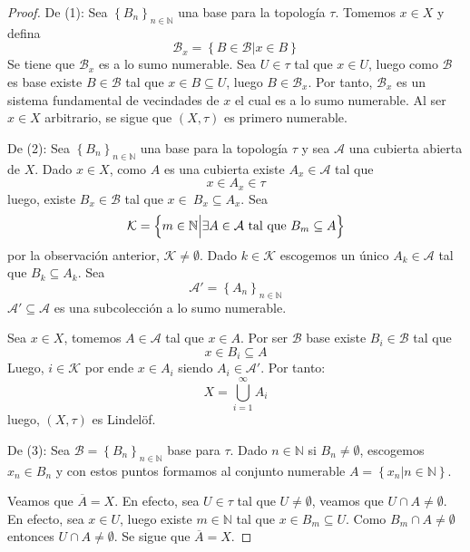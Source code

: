\documentclass[12pt]{report}
\theoremstyle{largebreak}
\newcommand{\Cls}[1]{\ensuremath{\overline{#1}}}
\begin{document}
    \begin{proof}
        De (1): Sea $\left\{ B_n\right\}_{ n\in\mathbb{N}}$ una base para la topología $\tau$. Tomemos $x\in X$ y defina
        \begin{equation*}
            \mathcal{B}_x=\left\{B\in\mathcal{B} \Big|x\in B \right\}
        \end{equation*}
        Se tiene que $\mathcal{B}_x$ es a lo sumo numerable. Sea $U\in\tau$ tal que $x\in U$, luego como $\mathcal{B}$ es base existe $B\in\mathcal{B}$ tal que $x\in B\subseteq U$, luego $B\in\mathcal{B}_x$. Por tanto, $\mathcal{B}_x$ es un sistema fundamental de vecindades de $x$ el cual es a lo sumo numerable. Al ser $x\in X$ arbitrario, se sigue que $(X,\tau)$ es primero numerable.

        De (2): Sea $\left\{ B_n\right\}_{ n\in\mathbb{N}}$ una base para la topología $\tau$ y sea $\mathcal{A}$ una cubierta abierta de $X$. Dado $x\in X$, como $A$ es una cubierta existe $A_x\in\mathcal{A}$ tal que
        \begin{equation*}
            x\in A_x\in\tau
        \end{equation*}
        luego, existe $B_x\in\mathcal{B}$ tal que $x\in\ B_x\subseteq A_x$. Sea
        \begin{equation*}
            \mathcal{K}=\left\{m\in\mathbb{N}\Big|\exists A\in\mathcal{A}\textup{ tal que }B_m\subseteq A \right\}
        \end{equation*}
        por la observación anterior, $\mathcal{K}\neq\emptyset$. Dado $k\in\mathcal{K}$ escogemos un único $A_k\in\mathcal{A}$ tal que $B_k\subseteq A_k$. Sea
        \begin{equation*}
            \mathcal{A}'=\left\{ A_n\right\}_{ n\in\mathbb{N}}
        \end{equation*}
        $\mathcal{A}'\subseteq\mathcal{A}$ es una subcolección a lo sumo numerable.

        Sea $x\in X$, tomemos $A\in\mathcal{A}$ tal que $x\in A$. Por ser $\mathcal{B}$ base existe $B_i\in\mathcal{B}$ tal que
        \begin{equation*}
            x\in B_i\subseteq A
        \end{equation*}
        Luego, $i\in\mathcal{K}$ por ende $x\in A_i$ siendo $A_i\in\mathcal{A}'$. Por tanto:
        \begin{equation*}
            X=\bigcup_{ i=1}^\infty A_i
        \end{equation*}
        luego, $(X,\tau)$ es Lindelöf.

        De (3): Sea $\mathcal{B}=\left\{B_n\right\}_{ n\in\mathbb{N}}$ base para $\tau$. Dado $n\in\mathbb{N}$ si $B_n\neq\emptyset$, escogemos $x_n\in B_n$ y con estos puntos formamos al conjunto numerable $A=\left\{x_n\Big|n\in\mathbb{N} \right\}$.

        Veamos que $\Cls{A}=X$. En efecto, sea $U\in\tau$ tal que $U\neq\emptyset$, veamos que $U\cap A\neq\emptyset$. En efecto, sea $x\in U$, luego existe $m\in\mathbb{N}$ tal que $x\in B_m\subseteq U$. Como $B_m\cap A\neq\emptyset$ entonces $U\cap A\neq\emptyset$. Se sigue que $\Cls{A}=X$.
    \end{proof}
\end{document}
